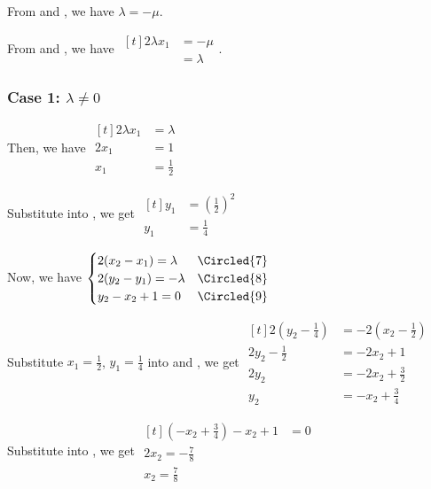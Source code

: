 \documentclass[11pt,fleqn]{book} %
\begin{document}
From  and , we have $\lambda = -\mu$. 

From  and , we have $\begin{aligned}[t]
    2\lambda x_1 & = -\mu    \\
                 & = \lambda
\end{aligned}$.

\subsubsection*{Case 1: $\lambda \neq 0$}

Then, we have $\begin{aligned}[t]
    2\lambda x_1 & = \lambda    \\
    2x_1         & = 1          \\
    x_1          & = \frac{1}{2}
\end{aligned}$

Substitute into , we get $\begin{aligned}[t]
    y_1 & = \left( \frac{1}{2} \right)^2 \\
    y_1 & = \frac{1}{4}
\end{aligned}$

Now, we have $\begin{cases}
    2(x_2 - x_1) = \lambda  & \Circled{7} \\
    2(y_2 - y_1) = -\lambda & \Circled{8}  \\
    y_2 - x_2 + 1 = 0       & \Circled{9} 
\end{cases}$

Substitute $x_1 = \frac{1}{2}$, $y_1 = \frac{1}{4}$ into  and , we get 
$\begin{aligned}[t]
    2(y_2 - \frac{1}{4}) & = -2(x_2 - \frac{1}{2}) \\
    2y_2 - \frac{1}{2}   & = -2x_2 + 1             \\
    2y_2                 & = -2x_2 + \frac{3}{2}   \\
    y_2                  & = -x_2 + \frac{3}{4}
\end{aligned}$

Substitute into , we get $\begin{aligned}[t]
    ( -x_2 + \frac{3}{4} ) - x_2 + 1 & = 0 \\
    2x_2 = -\frac{7}{8}                    \\
    x_2 = \frac{7}{8}
\end{aligned}$
\end{document}

